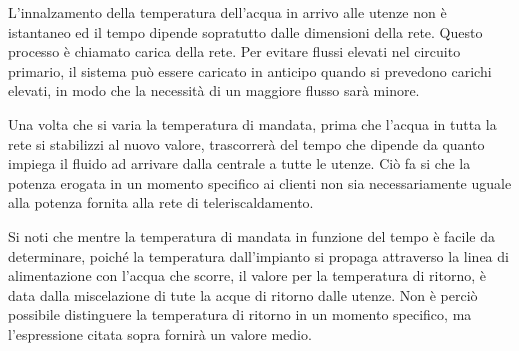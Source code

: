 \documentclass[laurea,oneside,11pt]{USiena_tesiLM3}
\begin{document}
L'innalzamento della temperatura dell'acqua in arrivo alle utenze non è istantaneo ed il tempo dipende sopratutto dalle dimensioni della rete. Questo processo è chiamato carica della rete. Per evitare flussi elevati nel circuito primario, il sistema può essere caricato in anticipo quando si prevedono carichi elevati, in modo che la necessità di un maggiore flusso sarà minore.

Una volta che si varia la temperatura di mandata, prima che l'acqua in tutta la rete si stabilizzi al nuovo valore, trascorrerà del tempo che dipende da quanto  impiega il fluido ad arrivare dalla centrale a tutte le utenze. Ciò fa si che la potenza erogata in un momento specifico ai clienti non sia necessariamente uguale alla potenza fornita alla rete di teleriscaldamento.

%

Si noti che mentre la temperatura di mandata in funzione del tempo è facile da determinare, poiché la temperatura dall'impianto si propaga attraverso la linea di alimentazione con l'acqua che scorre, il valore per la temperatura di ritorno, è data dalla miscelazione di tute la acque di ritorno dalle utenze. Non è perciò possibile distinguere la temperatura di ritorno in un momento specifico, ma l'espressione citata sopra fornirà un valore medio.
\end{document}
